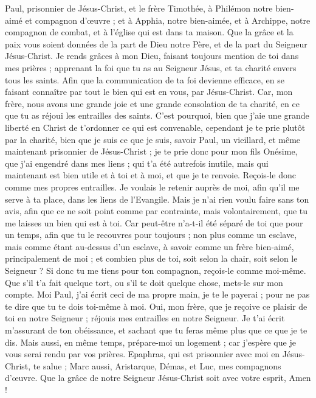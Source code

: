 \begin{multicols}{2}
\VerseOne{}Paul, prisonnier de Jésus-Christ, et le frère Timothée, à Philémon notre bien-aimé et compagnon d'œuvre ;
et à Apphia, notre bien-aimée, et à Archippe, notre compagnon de combat, et à l'église qui est dans ta maison.
Que la grâce et la paix vous soient données de la part de Dieu notre Père, et de la part du Seigneur Jésus-Christ.
Je rends grâces à mon Dieu, faisant toujours mention de toi dans mes prières ;
apprenant la foi que tu as au Seigneur Jésus, et ta charité envers tous les saints.
Afin que la communication de ta foi devienne efficace, en se faisant connaître par tout le bien qui est en vous, par Jésus-Christ.
Car, mon frère, nous avons une grande joie et une grande consolation de ta charité, en ce que tu as réjoui les entrailles des saints.
C'est pourquoi, bien que j'aie une grande liberté en Christ de t’ordonner ce qui est convenable,
cependant je te prie plutôt par la charité, bien que je suis ce que je suis, savoir Paul, un vieillard, et même maintenant prisonnier de Jésus-Christ ;
je te prie donc pour mon fils Onésime, que j'ai engendré dans mes liens ;
qui t'a été autrefois inutile, mais qui maintenant est bien utile et à toi et à moi, et que je te renvoie.
Reçois-le donc comme mes propres entrailles.
Je voulais le retenir auprès de moi, afin qu'il me serve à ta place, dans les liens de l'Evangile.
Mais je n'ai rien voulu faire sans ton avis, afin que ce ne soit point comme par contrainte, mais volontairement, que tu me laisses un bien qui est à toi.
Car peut-être n'a-t-il été séparé de toi que pour un temps, afin que tu le recouvres pour toujours ;
non plus comme un esclave, mais comme étant au-dessus d'un esclave, à savoir comme un frère bien-aimé, principalement de moi ; et combien plus de toi, soit selon la chair, soit selon le Seigneur ?
Si donc tu me tiens pour ton compagnon, reçois-le comme moi-même.
Que s'il t'a fait quelque tort, ou s'il te doit quelque chose, mets-le sur mon compte.
Moi Paul, j'ai écrit ceci de ma propre main, je te le payerai ; pour ne pas te dire que tu te dois toi-même à moi.
Oui, mon frère, que je reçoive ce plaisir de toi en notre Seigneur ; réjouis mes entrailles en notre Seigneur.
Je t'ai écrit m'assurant de ton obéissance, et sachant que tu feras même plus que ce que je te dis.
Mais aussi, en même temps, prépare-moi un logement ; car j'espère que je vous serai rendu par vos prières.
Epaphras, qui est prisonnier avec moi en Jésus-Christ, te salue ;
Marc aussi, Aristarque, Démas, et Luc, mes compagnons d'œuvre.
Que la grâce de notre Seigneur Jésus-Christ soit avec votre esprit, Amen !
\PPE{}
\end{multicols}
